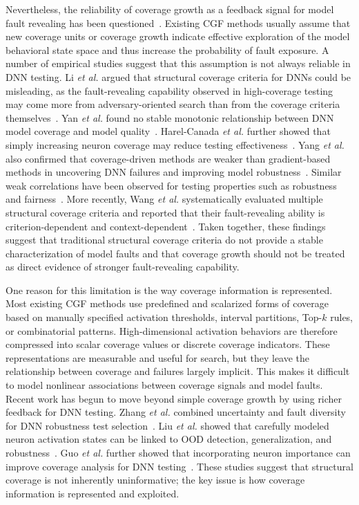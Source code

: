 \documentclass[preprint,number,5p,twocolumn]{elsarticle}
\begin{document}
\par Nevertheless, the reliability of coverage growth as a feedback signal for model fault revealing has been questioned~\cite{LiM0C19, YanTLZMX020, Harel-CanadaWGG20, YangSAL22}. Existing CGF methods usually assume that new coverage units or coverage growth indicate effective exploration of the model behavioral state space and thus increase the probability of fault exposure. A number of empirical studies suggest that this assumption is not always reliable in DNN testing. Li \emph{et al.} argued that structural coverage criteria for DNNs could be misleading, as the fault-revealing capability observed in high-coverage testing may come more from adversary-oriented search than from the coverage criteria themselves~\cite{LiM0C19}. Yan \emph{et al.} found no stable monotonic relationship between DNN model coverage and model quality~\cite{YanTLZMX020}. Harel-Canada \emph{et al.} further showed that simply increasing neuron coverage may reduce testing effectiveness~\cite{Harel-CanadaWGG20}. Yang \emph{et al.} also confirmed that coverage-driven methods are weaker than gradient-based methods in uncovering DNN failures and improving model robustness~\cite{YangSAL22}. Similar weak correlations have been observed for testing properties such as robustness and fairness~\cite{DongZWLSH0WDD20, zheng2024empirical}. More recently, Wang \emph{et al.} systematically evaluated multiple structural coverage criteria and reported that their fault-revealing ability is criterion-dependent and context-dependent~\cite{WangXFCLL24}. Taken together, these findings suggest that traditional structural coverage criteria do not provide a stable characterization of model faults and that coverage growth should not be treated as direct evidence of stronger fault-revealing capability.

\par One reason for this limitation is the way coverage information is represented. Most existing CGF methods use predefined and scalarized forms of coverage based on manually specified activation thresholds, interval partitions, Top-$k$ rules, or combinatorial patterns. High-dimensional activation behaviors are therefore compressed into scalar coverage values or discrete coverage indicators. These representations are measurable and useful for search, but they leave the relationship between coverage and failures largely implicit. This makes it difficult to model nonlinear associations between coverage signals and model faults. Recent work has begun to move beyond simple coverage growth by using richer feedback for DNN testing. Zhang \emph{et al.} combined uncertainty and fault diversity for DNN robustness test selection~\cite{ZhangMDCY25}. Liu \emph{et al.} showed that carefully modeled neuron activation states can be linked to OOD detection, generalization, and robustness~\cite{LiuTLM024}. Guo \emph{et al.} further showed that incorporating neuron importance can improve coverage analysis for DNN testing~\cite{guo2024neuron}. These studies suggest that structural coverage is not inherently uninformative; the key issue is how coverage information is represented and exploited.
\end{document}
